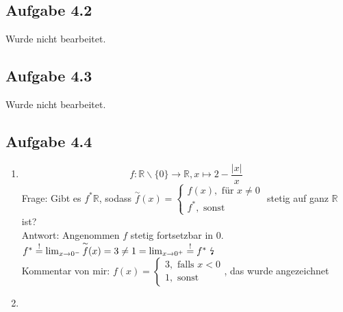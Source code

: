 \documentclass[
    accentcolor=pink,
    boxarc,
    dark_mode,
    logofile=enmpty
]{rubos-tuda-template}
\begin{document}
    \subsection*{Aufgabe 4.2}
    \begin{anmerkung}
        Wurde nicht bearbeitet.
    \end{anmerkung}

    \subsection*{Aufgabe 4.3}
    \begin{anmerkung}
        Wurde nicht bearbeitet.
    \end{anmerkung}

    \subsection*{Aufgabe 4.4}
    \begin{enumerate}[label={\alph*)}]
        \item
            \[f: \mathbb{R}\backslash\{0\} \rightarrow \mathbb{R}, x \mapsto 2 - \frac{|x|}{x}\]
            Frage: Gibt es $f^*\mathbb{R}$, sodass $\overset{\sim}{f}(x) =\begin{cases}
                    f(x), \text{ für } x \ne 0 \\
                    f^*, \text{ sonst}
                \end{cases}$ stetig auf ganz $\mathbb{R}$ ist? \\
            Antwort: Angenommen $f$ stetig fortsetzbar in 0. $f^* \overset{!}{=} \lim_{x \rightarrow 0^-} \overset{\sim}{f}(x) = 3 \ne 1 = \lim_{x \rightarrow 0^+} \overset{!}{=} f^*\ \text{\lightning}$ \\
            Kommentar von mir: $f(x) = \begin{cases}
                    3, \text{ falls } x < 0 \\
                    1, \text{ sonst}
                \end{cases}$, das wurde angezeichnet
        \item
    \end{enumerate}
\end{document}
